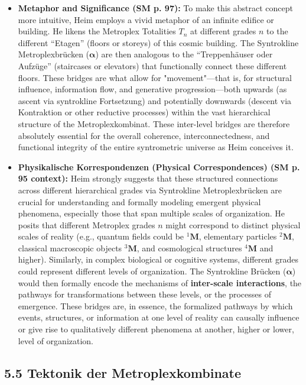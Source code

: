 \documentclass[12pt]{article}
\newcommand{\q}[1]{\enquote{#1}}
\newcommand{\metroplex}[1]{{}^{#1}\mathbf{M}}
\newcommand{\metroplextotalitaet}[1]{T_{#1}}
\begin{document}
\begin{itemize}
    \item \textbf{Metaphor and Significance (SM p. 97):}
    To make this abstract concept more intuitive, Heim employs a vivid metaphor of an infinite edifice or building. He likens the Metroplex Totalities \( \metroplextotalitaet{n} \) at different grades \(n\) to the different \q{Etagen} (floors or storeys) of this cosmic building. The Syntrokline Metroplexbrücken (\( \bm{\alpha} \)) are then analogous to the \q{Treppenhäuser oder Aufzüge} (staircases or elevators) that functionally connect these different floors. These bridges are what allow for "movement"—that is, for structural influence, information flow, and generative progression—both upwards (as ascent via syntrokline Fortsetzung) and potentially downwards (descent via Kontraktion or other reductive processes) within the vast hierarchical structure of the Metroplexkombinat. These inter-level bridges are therefore absolutely essential for the overall coherence, interconnectedness, and functional integrity of the entire syntrometric universe as Heim conceives it.

    \item \textbf{Physikalische Korrespondenzen (Physical Correspondences) (SM p. 95 context):}
    Heim strongly suggests that these structured connections across different hierarchical grades via Syntrokline Metroplexbrücken are crucial for understanding and formally modeling emergent physical phenomena, especially those that span multiple scales of organization. He posits that different Metroplex grades \( n \) might correspond to distinct physical scales of reality (e.g., quantum fields could be \( \metroplex{1} \), elementary particles \( \metroplex{2} \), classical macroscopic objects \( \metroplex{3} \), and cosmological structures \( \metroplex{4} \) and higher). Similarly, in complex biological or cognitive systems, different grades could represent different levels of organization. The Syntrokline Brücken (\( \bm{\alpha} \)) would then formally encode the mechanisms of \textbf{inter-scale interactions}, the pathways for transformations between these levels, or the processes of emergence. These bridges are, in essence, the formalized pathways by which events, structures, or information at one level of reality can causally influence or give rise to qualitatively different phenomena at another, higher or lower, level of organization.
\end{itemize}

\subsection{5.5 Tektonik der Metroplexkombinate}
\label{sec:tektonik}
\end{document}
